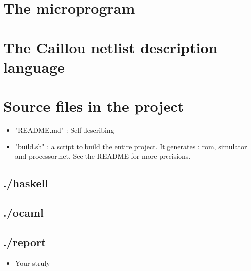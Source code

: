 \documentclass[a4paper, 11pt]{article}
\begin{document}
\section{The microprogram}


\section{The Caillou netlist description language}


\section{Source files in the project}
\begin{itemize}
\item "README.md" : Self describing
\item "build.sh" : a script to build the entire project. It generates : rom,
simulator and processor.net. See the README for more precisions.
\end{itemize}
\subsection{./haskell}

\subsection{./ocaml}

\subsection{./report}
\begin{itemize}
\item Your struly
\end{itemize}




\end{document}

